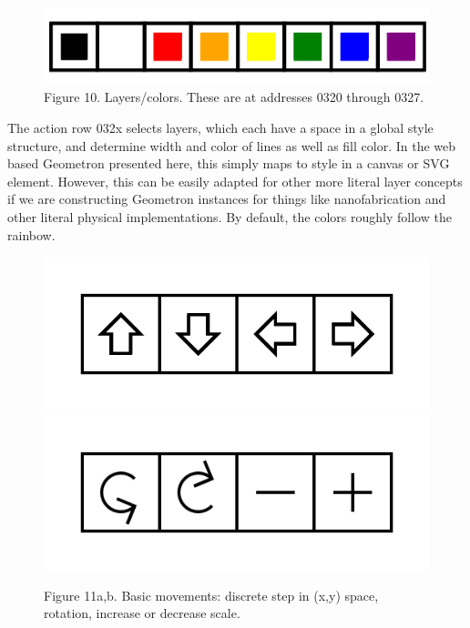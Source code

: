 \documentclass[11pt]{article}
\begin{document}
\begin{figure}

\includegraphics[width=\linewidth]{figures/figure10_layers.png}

\caption{Figure 10. Layers/colors.  These are at addresses 0320 through 0327.}
\end{figure}


    The action row 032x selects layers, which each have a space in a global style structure, and determine width and color of lines as well as fill color. In the web based Geometron presented here, this simply maps to style in a canvas or SVG element.  However, this can be easily adapted for other more literal layer concepts if we are constructing Geometron instances for things like nanofabrication and other literal physical implementations.  By default, the colors roughly follow the rainbow.




\begin{figure}

\includegraphics[width=\linewidth]{figures/figure11a_movements.png}
\includegraphics[width=\linewidth]{figures/figure11b_rotationscale.png}

\caption{Figure 11a,b. Basic movements: discrete step in (x,y) space, rotation, increase or decrease scale.}
\end{figure}
\end{document}
